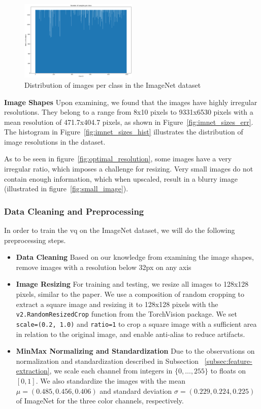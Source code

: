 \begin{figure}[ht]
    \centering
    \includegraphics[width=0.5\textwidth]{../../sample_images/imagenet_dist}
    \caption{Distribution of images per class in the ImageNet dataset}
    \label{fig:imnet_dist}
\end{figure}

\textbf{Image Shapes}
Upon examining, we found that the images have highly irregular resolutions.
They belong to a range from 8x10 pixels to 9331x6530 pixels with a mean resolution of 471.7x404.7 pixels, as shown in
Figure~\ref{fig:imnet_sizes_err}.
The histogram in Figure~\ref{fig:imnet_sizes_hist} illustrates the distribution of image resolutions in the dataset.

As to be seen in figure~\ref{fig:optimal_resolution}, some images have a very irregular ratio, which imposes a challenge
for resizing.
Very small images do not contain enough information, which when upscaled, result in a blurry image (illustrated in
figure~\ref{fig:small_image}).

\subsubsection{Data Cleaning and Preprocessing}
In order to train the \ac{vq} on the ImageNet dataset, we will do the following preprocessing steps.

\begin{itemize}
    \item \textbf{Data Cleaning}
    Based on our knowledge from examining the image shapes, remove images with a resolution below 32px on any axis
    \item \textbf{Image Resizing}
    For training and testing, we resize all images to 128x128 pixels, similar to the paper.
    We use a composition of random cropping to extract a square image and resizing it to 128x128 pixels with
    the \texttt{v2.RandomResizedCrop} function from the TorchVision package.
    We set \texttt{scale=(0.2, 1.0)} and \texttt{ratio=1} to crop a square image with a sufficient area in
    relation to the original image, and enable anti-alias to reduce artifacts.
    \item \textbf{MinMax Normalizing and Standardization}
    Due to the observations on normalization and standardization described in Subsection
    ~\ref{subsec:feature-extraction}, we scale each channel from integers in $\{0,\dots,255\}$ to floats on
    $[0,1]$.
    We also standardize the images with the mean $\mu = (0.485, 0.456, 0.406)$ and standard deviation
    $\sigma = (0.229, 0.224, 0.225)$ of ImageNet for the three color channels, respectively.
\end{itemize}

